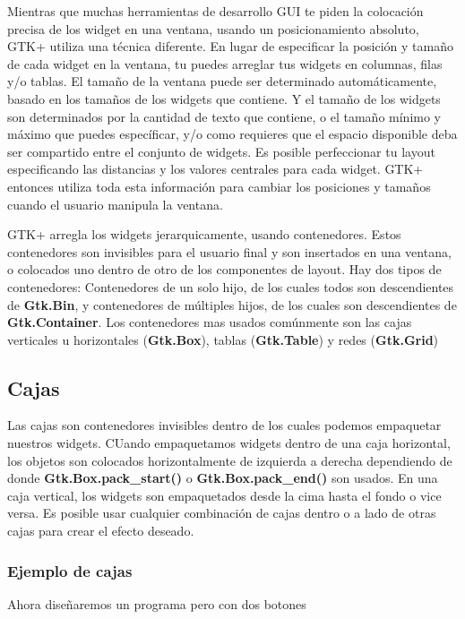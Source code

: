\documentclass[12pt, twoside]{report}
\begin{document}
Mientras que muchas herramientas de desarrollo GUI te piden la colocación precisa de los widget en una ventana, usando un posicionamiento absoluto, GTK+ utiliza una técnica diferente. En lugar de especificar la posición y tamaño de cada widget en la ventana, tu puedes arreglar tus widgets en columnas, filas y/o tablas. El tamaño de la ventana puede ser determinado automáticamente, basado en los tamaños de los widgets que contiene. Y el tamaño de los widgets son determinados por la cantidad de texto que contiene, o el tamaño mínimo y  máximo que puedes específicar, y/o como requieres que el espacio disponible deba ser compartido entre el conjunto de widgets. Es posible perfeccionar tu layout especificando las distancias y los valores centrales para cada widget. GTK+ entonces utiliza toda esta información para cambiar los posiciones y tamaños cuando el usuario manipula la ventana.

GTK+ arregla los widgets jerarquicamente, usando contenedores. Estos contenedores son invisibles para el usuario final y son insertados en una ventana, o colocados uno dentro de otro de los componentes de layout. Hay dos tipos de contenedores: Contenedores de un solo hijo, de los cuales todos son descendientes de \textbf{Gtk.Bin}, y contenedores de múltiples hijos, de los cuales son descendientes de \textbf{Gtk.Container}. Los contenedores mas usados comúnmente son las cajas verticales u horizontales (\textbf{Gtk.Box}), tablas (\textbf{Gtk.Table}) y redes (\textbf{Gtk.Grid})

\subsection{Cajas}

Las cajas son contenedores invisibles dentro de los cuales podemos empaquetar nuestros widgets. CUando empaquetamos widgets dentro de una caja horizontal, los objetos son colocados horizontalmente de izquierda a derecha dependiendo de donde \textbf{Gtk.Box.pack\_start()} o \textbf{Gtk.Box.pack\_end()} son usados. En una caja vertical, los widgets son empaquetados desde la cima hasta el fondo o vice versa. Es posible usar cualquier combinación de cajas dentro o a lado de otras cajas para crear el efecto deseado.

\subsubsection{Ejemplo de cajas}
\label{seccion003}

Ahora diseñaremos un programa pero con dos botones
\end{document}
